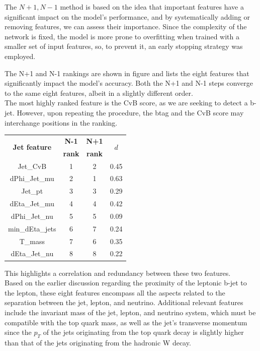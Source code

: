 The $N+1,N-1$ method is based on the idea that important features have a significant impact on the model's performance, and by systematically adding or removing features, we can assess their importance.
Since the complexity of the network is fixed, the model is more prone to overfitting when trained with a smaller set of input features, so, to prevent it, an early stopping strategy was employed.


\begin{minipage}{\linewidth}
\begin{minipage}{0.5\linewidth}
    The N+1 and N-1 rankings are shown in figure  and  lists the eight features that significantly impact the model's accuracy. Both the N+1 and N-1 steps converge to the same eight features, albeit in a slightly different order.\\
    The most highly ranked feature is the CvB score, as we are seeking to detect a b-jet. However, upon repeating the procedure, the btag and the CvB score may interchange positions in the ranking.

\end{minipage}
\hfill
\begin{minipage}{0.48\linewidth}

        \centering
         \fontsize{11pt}{11pt}\selectfont
        \begin{tabular}{c|c|c|c}
        \toprule
        \multirow{2}{*}{\textbf{Jet feature}} & \textbf{N-1} & \textbf{N+1} &  \multirow{2}{*}{$d$}\\
        & \textbf{rank} & \textbf{rank}\\
        \midrule
        Jet\_CvB & 1 & 2 & 0.45\\
        dPhi\_Jet\_mu & 2&1 & 0.63 \\
        Jet\_pt & 3& 3 & 0.29\\
        dEta\_Jet\_mu & 4& 4 & 0.42\\
        dPhi\_Jet\_nu & 5&5 & 0.09\\
        min\_dEta\_jets & 6& 7 & 0.24\\
        T\_mass &7 & 6 & 0.35\\
        dEta\_Jet\_nu & 8& 8 & 0.22\\
        \bottomrule
        \end{tabular}
        \label{tab:rank}
\end{minipage}   
\end{minipage}
This highlights a correlation and redundancy between these two features.\\
Based on the earlier discussion regarding the proximity of the leptonic b-jet to the lepton, these eight features encompass all the aspects related to the separation between the jet, lepton, and neutrino. Additional relevant features include the invariant mass of the jet, lepton, and neutrino system, which must be compatible with the top quark mass, as well as the jet's transverse momentum since the $p_T$ of the jets originating from the top quark decay is slightly higher than that of the jets originating from the hadronic W decay.


